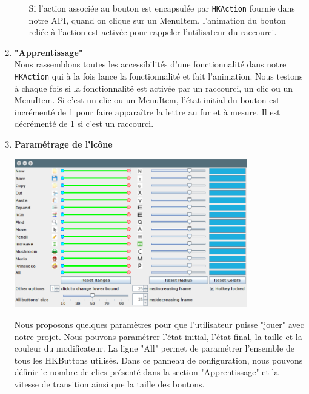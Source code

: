 \documentclass[12pt,a4paper]{article}
\begin{document}
\begin{enumerate}
\begin{enumerate}
Si l'action associée au bouton est encapsulée par \texttt{HKAction} fournie dans notre API, quand on clique sur un MenuItem, l'animation du bouton reliée à l'action est activée pour rappeler l'utilisateur du raccourci.
\end{enumerate}
\item {\large \textbf{"Apprentissage"}}\\
Nous rassemblons toutes les accessibilités d'une fonctionnalité dans notre \texttt{HKAction} qui à la fois lance la fonctionnalité et fait l'animation. Nous testons à chaque fois si la fonctionnalité est activée par un raccourci, un clic ou un MenuItem. Si c'est un clic ou un MenuItem, l'état initial du bouton est incrémenté de 1 pour faire apparaître la lettre au fur et à mesure. Il est décrémenté de 1 si c'est un raccourci. 
\item {\large \textbf{Paramétrage de l'icône}}\\
\begin{center}
	\includegraphics[width=0.8\textwidth]{11.png}
\end{center}
Nous proposons quelques paramètres pour que l'utilisateur puisse "jouer" avec notre projet. Nous pouvons paramétrer l'état initial, l'état final, la taille et la couleur du modificateur. La ligne "All" permet de paramétrer l'ensemble de tous les HKButtons utilisés. Dans ce panneau de configuration, nous pouvons définir le nombre de clics présenté dans la section "Apprentissage" et la vitesse de transition ainsi que la taille des boutons.
\end{enumerate}
\end{document}

